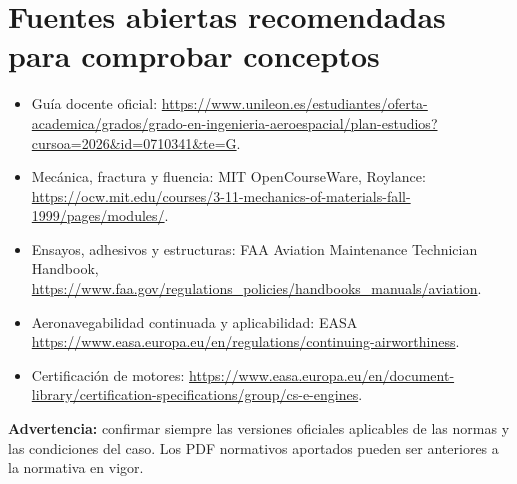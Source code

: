 \section*{Fuentes abiertas recomendadas para comprobar conceptos}
\begin{itemize}
\item Guía docente oficial: \url{https://www.unileon.es/estudiantes/oferta-academica/grados/grado-en-ingenieria-aeroespacial/plan-estudios?cursoa=2026&id=0710341&te=G}.
\item Mecánica, fractura y fluencia: MIT OpenCourseWare, Roylance: \url{https://ocw.mit.edu/courses/3-11-mechanics-of-materials-fall-1999/pages/modules/}.
\item Ensayos, adhesivos y estructuras: FAA Aviation Maintenance Technician Handbook, \url{https://www.faa.gov/regulations_policies/handbooks_manuals/aviation}.
\item Aeronavegabilidad continuada y aplicabilidad: EASA \url{https://www.easa.europa.eu/en/regulations/continuing-airworthiness}.
\item Certificación de motores: \url{https://www.easa.europa.eu/en/document-library/certification-specifications/group/cs-e-engines}.
\end{itemize}
\noindent\textbf{Advertencia:} confirmar siempre las versiones oficiales aplicables de las normas y las condiciones del caso. Los PDF normativos aportados pueden ser anteriores a la normativa en vigor.
